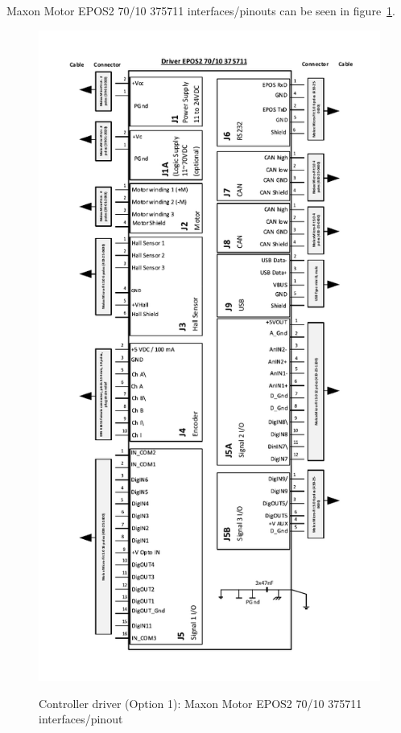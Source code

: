 Maxon Motor EPOS2 70/10 375711 interfaces/pinouts can be seen in figure~\ref{FIG:DEVICEDRIVEROPTION1DRAWING}.
\begin{figure}
  \centering
  \includegraphics[angle=90,width=1\columnwidth]{figs/body02/FIGDEVICEDRIVEROPTION1DRAWING.pdf}\\
  \caption[Controller driver (Option 1): Maxon Motor EPOS2 70/10 375711 interfaces/pinout]{Controller driver (Option 1): Maxon Motor EPOS2 70/10 375711 interfaces/pinout}
  \label{FIG:DEVICEDRIVEROPTION1DRAWING}
\end{figure}

